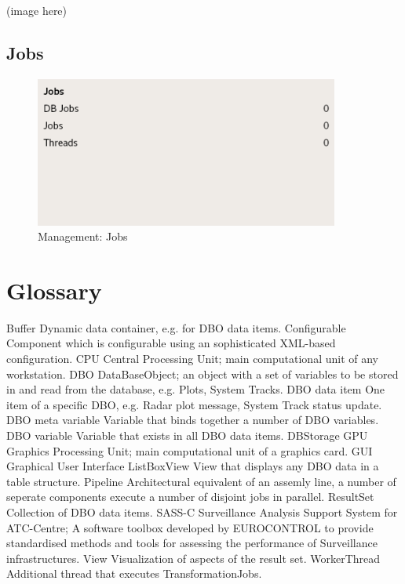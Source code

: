 \documentclass[10pt,letterpaper,extrafontsizes]{memoir}
\begin{document}
(image here)

\subsection{Jobs}

\begin{figure}[H]
  \center
    \includegraphics[width=10cm]{../screenshots/management_jobs.png}
  \caption{Management: Jobs}
  \label{fig:management_jobs}
\end{figure}

\section{Glossary}
Buffer
Dynamic data container, e.g. for DBO data items.
Configurable
Component which is configurable using an sophisticated XML-based configuration.
CPU
Central Processing Unit; main computational unit of any workstation.
DBO
DataBaseObject; an object with a set of variables to be stored in and read from the database, e.g. Plots, System Tracks.
DBO data item
One item of a specific DBO, e.g. Radar plot message, System Track status update.
DBO meta variable
Variable that binds together a number of DBO variables. 
DBO variable
Variable that exists in all DBO data items.
DBStorage
GPU
Graphics Processing Unit; main computational unit of a graphics card.
GUI
Graphical User Interface
ListBoxView
View that displays any DBO data in a table structure.
Pipeline
Architectural equivalent of an assemly line, a number of seperate components execute a number of disjoint jobs in parallel.
ResultSet
Collection of DBO data items.
SASS-C
Surveillance Analysis Support System for ATC-Centre; A software toolbox developed by EUROCONTROL to provide standardised methods and tools for assessing the performance of Surveillance
infrastructures.
View
Visualization of aspects of the result set.
WorkerThread
Additional thread that executes TransformationJobs.


\end{document}
